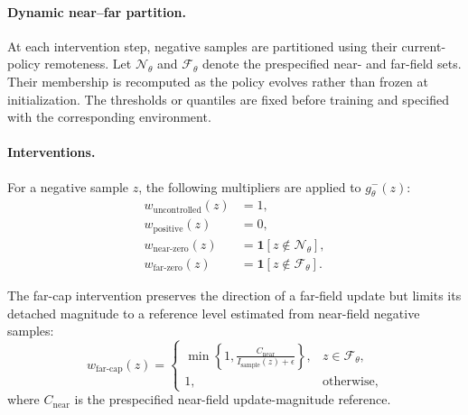 \paragraph{Dynamic near--far partition.}
At each intervention step, negative samples are partitioned using their
current-policy remoteness. Let
$\mathcal N_\theta$
and
$\mathcal F_\theta$
denote the prespecified near- and far-field sets. Their membership is
recomputed as the policy evolves rather than frozen at initialization.
The thresholds or quantiles are fixed before training and specified with the
corresponding environment.

\paragraph{Interventions.}
For a negative sample $z$, the following multipliers are applied to
$g_\theta^-(z)$:
\begin{equation}
\begin{aligned}
    w_{\mathrm{uncontrolled}}(z)
    &=1,\\
    w_{\mathrm{positive}}(z)
    &=0,\\
    w_{\mathrm{near\text{-}zero}}(z)
    &=
    \mathbf 1[z\notin\mathcal N_\theta],\\
    w_{\mathrm{far\text{-}zero}}(z)
    &=
    \mathbf 1[z\notin\mathcal F_\theta].
\end{aligned}
\label{eq:causal_zero_interventions}
\end{equation}

The far-cap intervention preserves the direction of a far-field update
but limits its detached magnitude to a reference level estimated from
near-field negative samples:
\begin{equation}
    w_{\mathrm{far\text{-}cap}}(z)
    =
    \begin{cases}
        \displaystyle
        \min\left\{
            1,
            \frac{C_{\mathrm{near}}}
                 {I_{\mathrm{sample}}(z)+\epsilon}
        \right\},
        & z\in\mathcal F_\theta,\\[3mm]
        1,
        & \text{otherwise},
    \end{cases}
    \label{eq:causal_far_cap}
\end{equation}
where $C_{\mathrm{near}}$ is the prespecified near-field update-magnitude
reference.

